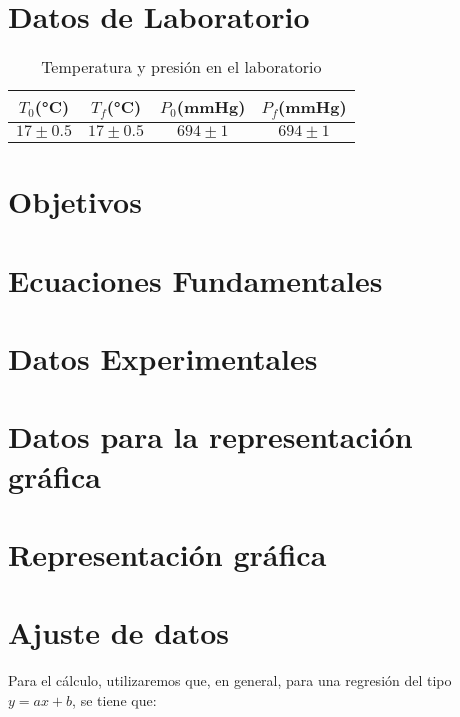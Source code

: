 \documentclass[a4paper,12pt]{article}
\begin{document}
\title{}
\author{\underline{Gabriel D'Andrade Furlanetto}, Sergio Bernardo Pérez} 
\maketitle

\newpage
\thispagestyle{empty}
\mbox{}
\newpage 


\section{Datos de Laboratorio}
\begin{table}[h!]
  \centering
  \caption{Temperatura y presión en el laboratorio}
  \label{bar}
  \begin{tabular}{|c|c|c|c|}
  \hline
    $T_0$(°C) & $T_f$(°C) & $P_0$(mmHg) & $P_f$(mmHg) \\ 
    \hline
    $17\pm 0.5$&$17\pm 0.5$ & $694 \pm 1$&$ 694 \pm 1$ \\ 
    \hline 
  \end{tabular}
\end{table}


\section{Objetivos}

\section{Ecuaciones Fundamentales}


\section{Datos Experimentales}

\section{Datos para la representación gráfica}

\section{Representación gráfica}


\section{Ajuste de datos}
Para el cálculo, utilizaremos que, en general, para una regresión del tipo $y = ax + b$, se tiene que:
\end{document}
